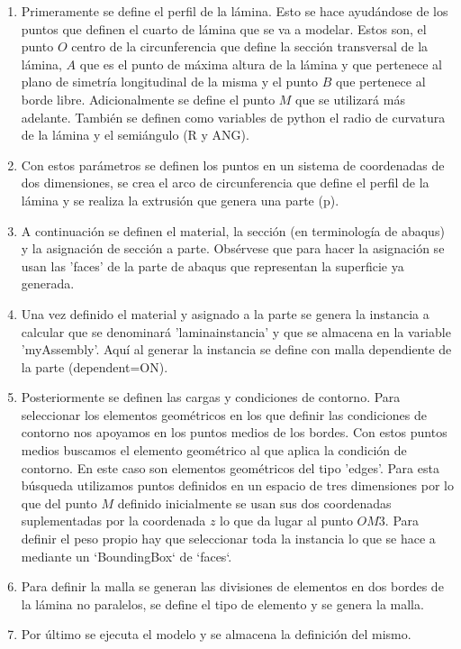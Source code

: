 \documentclass[spanish,a4paper,12pt]{article}
\begin{document}
\begin{enumerate}
\item
Primeramente se define el perfil de la lámina. Esto se hace ayudándose de los puntos que definen el cuarto de lámina que se va a modelar.
Estos son, el punto $O$ centro de la circunferencia que define la sección transversal de la lámina, $A$ que es el punto de máxima altura de la lámina y que 
pertenece al plano de simetría longitudinal de la misma y el punto $B$ que pertenece al borde libre. Adicionalmente se define el punto $M$ que se utilizará 
más adelante.
También se definen como variables de python el radio de curvatura de la lámina y el semiángulo (R y ANG).
\item
Con estos parámetros se definen los puntos en un sistema de coordenadas de dos dimensiones, se crea el arco de circunferencia que
define el perfil de la lámina y se realiza la extrusión que genera una parte (p).
\item
A continuación se definen el material, la sección (en terminología de abaqus) y la asignación de sección a parte.
Obsérvese que para hacer la asignación se usan las  'faces' de la parte de abaqus que representan la superficie ya generada.
\item
Una vez definido el material y asignado a la parte se genera la instancia a calcular que se denominará 'laminainstancia' y que se almacena en la 
variable 'myAssembly'. Aquí al generar la instancia se define con malla dependiente de la parte (dependent=ON).
\item
Posteriormente se definen las cargas y condiciones de contorno.
Para seleccionar los elementos geométricos en los que definir las condiciones de contorno nos apoyamos en los puntos medios de los bordes.
Con estos puntos medios buscamos el elemento geométrico al que aplica la condición de contorno. En este caso son elementos geométricos del tipo 'edges'. Para
esta búsqueda utilizamos puntos definidos en un espacio de tres dimensiones por lo que del punto $M$ definido inicialmente se usan sus dos coordenadas suplementadas
por la coordenada $z$ lo que da lugar al punto $OM3$.
Para definir el peso propio hay que seleccionar toda la instancia lo que se hace a  mediante un `BoundingBox` de `faces`.
\item
Para definir la malla se generan las divisiones de elementos en dos bordes de la lámina no paralelos, se define el tipo de elemento y se genera la malla.
\item
Por último se ejecuta el modelo y se almacena la definición del mismo.
\end{enumerate}
\end{document}
